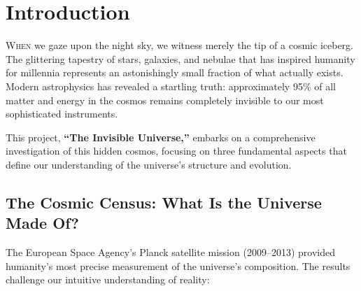 \documentclass[11pt,a4paper]{article}
\begin{document}
\setcounter{page}{1}

\tableofcontents
\thispagestyle{fancy}

\newpage

\listoffigures
\listoftables

\newpage

\section{Introduction}
\label{sec:introduction}

\lettrine[lines=3, loversize=0.1, nindent=0.5em]{W}{hen} we gaze upon the night sky, we witness merely the tip of a cosmic iceberg. The glittering tapestry of stars, galaxies, and nebulae that has inspired humanity for millennia represents an astonishingly small fraction of what actually exists. Modern astrophysics has revealed a startling truth: approximately 95\% of all matter and energy in the cosmos remains completely invisible to our most sophisticated instruments.

This project, \textbf{``The Invisible Universe,''} embarks on a comprehensive investigation of this hidden cosmos, focusing on three fundamental aspects that define our understanding of the universe's structure and evolution.

\subsection{The Cosmic Census: What Is the Universe Made Of?}

The European Space Agency's Planck satellite mission (2009--2013) provided humanity's most precise measurement of the universe's composition. The results challenge our intuitive understanding of reality:
\end{document}

